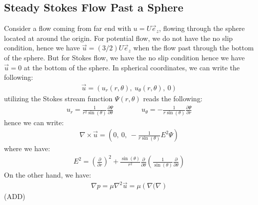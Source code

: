\documentclass[11pt]{book}
\theoremstyle{break}
\theoremstyle{break}
\newcommand{\pd}{\partial}
\begin{document}
\subsection{Steady Stokes Flow Past a Sphere}
Consider a flow coming from far end with $u = U \vec{e}_z$, flowing through the sphere located at around the origin. For potential flow, we do not have the no slip condition, hence we have $\vec{u} = (3/2) U \vec{e}_z$ when the flow past through the bottom of the sphere. But for Stokes flow, we have the no slip condition hence we have $\vec{u} = 0$ at the bottom of the sphere. In spherical coordinates, we can write the following:
\begin{align*}
\vec{u} = \left( u_r(r,\theta) , \ u_{\theta}(r,\theta), \ 0 \right)
\end{align*}
utilizing the Stokes stream function $\Psi (r,\theta)$ reads the following:
\begin{align*}
u_r = \frac{1}{r^2 \sin(\theta)}\frac{\pd \Psi}{\pd \theta} \qquad\qquad u_{\theta} = -\frac{1}{r\sin(\theta)} \frac{\pd \Psi}{\pd r}
\end{align*}
hence we can write:
\begin{align*}
\nabla \times \vec{u} = \left( 0, \ 0, \ -\frac{1}{r\sin(\theta)}E^2 \Psi\right)
\end{align*}
where we have:
\begin{align*}
E^2 = \left(\frac{\pd}{\pd r}\right)^2 + \frac{\sin(\theta)}{r^2}\frac{\pd}{\pd \theta}\left( \frac{1}{\sin(\theta)}\frac{\pd}{\pd \theta}\right)
\end{align*}
On the other hand, we have:
\begin{align*}
\nabla p = \mu \nabla^2 \vec{u} = \mu \left( \nabla ( \nabla     \right)
\end{align*}
(ADD)\\
\end{document}
